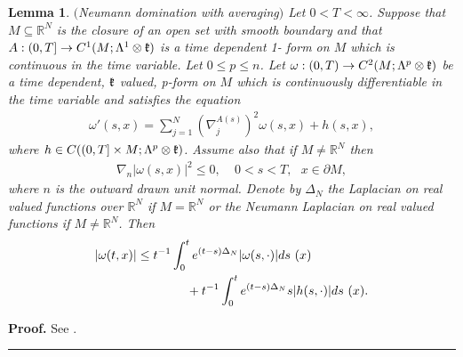\documentclass[12pt]{article}
\newtheorem{lemma}[theorem]{Lemma}
\newenvironment{proof}[1][Proof]{\textbf{#1.} }{\ \rule{0.5em}{0.5em}}
\def \L{\Lambda}
\def \R{\mathbb R}
\def \w{\omega}
\def \kf{\frak k}
\def \p{\partial}
\def \n{\nabla}
\numberwithin{equation}{section}
\begin{document}
     \begin{lemma} \label{lemnda1}$($Neumann domination with averaging$)$ Let $0 < T < \infty$.
Suppose that $M\subseteq \R^N$ is the closure of an open set with smooth boundary and that
  $A:(0, T] \rightarrow C^1(M; \L^1\otimes \kf)$ is a time dependent  1- form on $M$ which is continuous in the time variable.
 Let $0 \le p \le n$. Let $\w: (0,T) \rightarrow C^2( M;\L^p \otimes \kf)$ be a time dependent, $\kf$ valued, p-form on $M$ which is continuously differentiable in the time variable and satisfies the equation
 \begin{align}
 \w'(s,x)  =\sum_{j=1}^N(\n_j^{A(s)} )^2 \w(s,x) + h(s, x),     \label{nda5.1}
 \end{align}
 where $h \in C((0, T]\times M; \L^p \otimes \kf)$. Assume also that if $M \ne \R^N$ then
 \begin{align}
 \n_{n} |\w(s,x)|^2 \le 0,\ \ \ \ \ 0< s <T,  \ \ \  x\in \p M,              \label{nda6.1}
 \end{align}
 where   $n$ is the outward drawn unit normal.
 Denote by $\Delta_N$ the Laplacian on real valued functions over $\R^N$ if $M = \R^N$
  or the Neumann Laplacian  on real valued functions if  $M \ne \R^N$.
 Then 
 \begin{align}
 |\w(t,x)| &\le t^{-1} \int_0^t e^{(t-s)\Delta_N} |\w(s, \cdot)| ds\ (x)    \notag\\
 &\qquad\qquad +  t^{-1}\int_0^t  e^{(t-s)\Delta_N} s|h(s, \cdot)| ds\ (x) .         \label{nda7.1}
 \end{align} 
 \end{lemma}
    \begin{proof} See \cite[Proposition 4.21]{G70}. 
    \end{proof}
 
\end{document}
